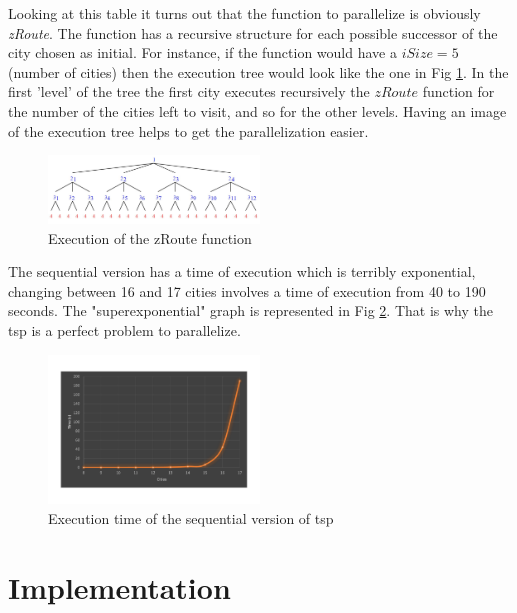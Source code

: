 \documentclass[11pt,conference]{IEEEtran}
\begin{document}
Looking at this table it turns out that the function to parallelize is obviously \textit{zRoute}.
\newline
The function has a recursive structure for each possible successor of the city chosen as initial. For instance, if the function would have a $iSize = 5$ (number of cities) then the execution tree would look like the one in Fig \ref{fig:tree}. 
In the first 'level' of the tree the first city executes recursively the $zRoute$ function for the number of the cities left to visit, and so for the other levels.
Having an image of the execution tree helps to get the parallelization easier.
\begin{figure}[h!]
  \centering
    \includegraphics[width=0.5\textwidth]{tree}
    \caption{Execution of the zRoute function}
    \label{fig:tree}
\end{figure}
\newline
The sequential version has a time of execution which is terribly exponential, changing between 16 and 17 cities involves a time of execution from 40 to 190 seconds. The "superexponential" graph is represented in Fig \ref{fig:node-scaling-seq}.
That is why the tsp is a perfect problem to parallelize.
\begin{figure}[h!]
  \centering
    \includegraphics[trim=0.0cm 3.5cm 0.0cm 3.5cm, width=0.5\textwidth]{node-scaling-seq}
    \caption{Execution time of the sequential version of tsp}
    \label{fig:node-scaling-seq}
\end{figure}
\section{Implementation}
\end{document}

